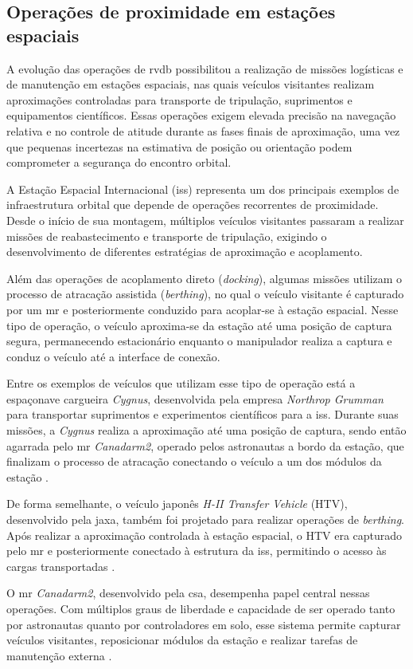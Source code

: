 \subsection{Operações de proximidade em estações espaciais}
\label{subsec_operacoes_proximidade_estacoes}

A evolução das operações de \gls{rvdb} possibilitou a realização de missões logísticas e de manutenção em estações espaciais, nas quais veículos visitantes realizam aproximações controladas para transporte de tripulação, suprimentos e equipamentos científicos. 
Essas operações exigem elevada precisão na navegação relativa e no controle de atitude durante as fases finais de aproximação, uma vez que pequenas incertezas na estimativa de posição ou orientação podem comprometer a segurança do encontro orbital.

A Estação Espacial Internacional (\gls{iss}) representa um dos principais exemplos de infraestrutura orbital que depende de operações recorrentes de proximidade. 
Desde o início de sua montagem, múltiplos veículos visitantes passaram a realizar missões de reabastecimento e transporte de tripulação, exigindo o desenvolvimento de diferentes estratégias de aproximação e acoplamento.

Além das operações de acoplamento direto (\emph{docking}), algumas missões utilizam o processo de atracação assistida (\emph{berthing}), no qual o veículo visitante é capturado por um \gls{mr} e posteriormente conduzido para acoplar-se à estação espacial. 
Nesse tipo de operação, o veículo aproxima-se da estação até uma posição de captura segura, permanecendo estacionário enquanto o manipulador realiza a captura e conduz o veículo até a interface de conexão.

Entre os exemplos de veículos que utilizam esse tipo de operação está a espaçonave cargueira \emph{Cygnus}, desenvolvida pela empresa \emph{Northrop Grumman} para transportar suprimentos e experimentos científicos para a \gls{iss}. 
Durante suas missões, a \emph{Cygnus} realiza a aproximação até uma posição de captura, sendo então agarrada pelo \gls{mr} \emph{Canadarm2}, operado pelos astronautas a bordo da estação, que finalizam o processo de atracação conectando o veículo a um dos módulos da estação \cite{nasaCygnus}.

De forma semelhante, o veículo japonês \emph{H-II Transfer Vehicle} (HTV), desenvolvido pela \gls{jaxa}, também foi projetado para realizar operações de \emph{berthing}. 
Após realizar a aproximação controlada à estação espacial, o HTV era capturado pelo \gls{mr} e posteriormente conectado à estrutura da \gls{iss}, permitindo o acesso às cargas transportadas \cite{nasaHTV}.

O \gls{mr} \emph{Canadarm2}, desenvolvido pela \gls{csa}, desempenha papel central nessas operações. 
Com múltiplos graus de liberdade e capacidade de ser operado tanto por astronautas quanto por controladores em solo, esse sistema permite capturar veículos visitantes, reposicionar módulos da estação e realizar tarefas de manutenção externa \cite{canadarm2}.
